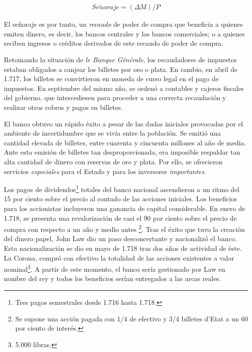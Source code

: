 \begin{gather*}
	Se\tilde{n}oraje = (\Delta M)/P
\end{gather*}

El señoraje es por tanto, un \emph{recaudo} de poder de compra que beneficia a quienes emiten dinero, es decir, los bancos centrales y los bancos comerciales; o a quienes reciben ingresos o créditos derivados de este recaudo de poder de compra.

Retomando la situación de \emph{le Banque Générale}, los recaudadores de impuestos estaban obligados a canjear los billetes por oro o plata. En cambio, en abril de 1.717, los billetes se convirtieron en moneda de curso legal en el pago de impuestos. En septiembre del mismo año, se ordenó a contables y cajeros fiscales del gobierno, que intercediesen para proceder a una correcta recaudación y realizar otros cobros y pagos en billetes. 

El banco obtuvo un rápido éxito a pesar de las dudas iniciales provocadas por el ambiente de incertidumbre que se vivía entre la población. Se emitió una cantidad elevada de billetes, entre cuarenta y cincuenta millones al año de media. Ante esta emisión de billetes tan desproporcionada, era imposible respaldar tan alta cantidad de dinero con reservas de oro y plata. Por ello, se ofrecieron servicios \emph{especiales} para el Estado y para los inversores \emph{importantes}.

Los pagos de dividendos\footnote{Tres pagos semestrales desde 1.716 hasta 1.718.} totales del banco nacional ascendieron a un ritmo del 15 por ciento sobre el precio al contado de las acciones iniciales. Los beneficios para los accionistas incluyeron una ganancia de capital considerable. En enero de 1.718, se presenta una revalorización de casi el 90 por ciento sobre el precio de compra con respecto a un año y medio antes \footnote{Se supone una acción pagada con 1/4 de efectivo y 3/4 billetes d'Etat a un 60 por ciento de interés.}. Tras el éxito que tuvo la creación del dinero papel, John Law dio un paso desconcertante y nacionalizó el banco. Esta nacionalización se dio en mayo de 1.718 tras dos años de actividad de éste. La Corona, compró con efectivo la totalidad de las acciones existentes a valor nominal\footnote{5.000 libras.}. A partir de este momento, el banco sería gestionado por Law en nombre del rey y todos los beneficios serían entregados a las arcas reales. 

